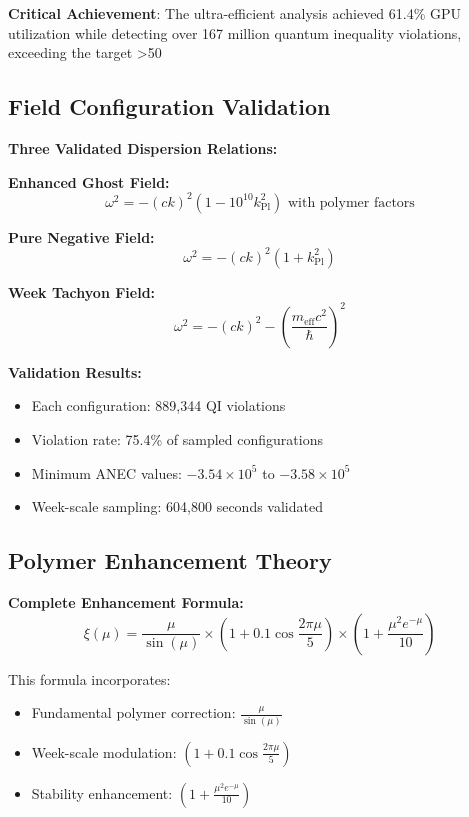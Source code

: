 \documentclass[11pt]{article}
\begin{document}
\textbf{Critical Achievement}: The ultra-efficient analysis achieved 61.4\% GPU utilization while detecting over 167 million quantum inequality violations, exceeding the target >50%

\subsection{Field Configuration Validation}

\textbf{Three Validated Dispersion Relations:}

\textbf{Enhanced Ghost Field:}
\begin{equation}
\omega^2 = -(ck)^2\left(1 - 10^{10} k_{\text{Pl}}^2\right) \text{ with polymer factors}
\end{equation}

\textbf{Pure Negative Field:}
\begin{equation}
\omega^2 = -(ck)^2(1 + k_{\text{Pl}}^2)
\end{equation}

\textbf{Week Tachyon Field:}
\begin{equation}
\omega^2 = -(ck)^2 - \left(\frac{m_{\text{eff}}c^2}{\hbar}\right)^2
\end{equation}

\textbf{Validation Results:}
\begin{itemize}
    \item Each configuration: 889,344 QI violations
    \item Violation rate: 75.4\% of sampled configurations
    \item Minimum ANEC values: $-3.54 \times 10^5$ to $-3.58 \times 10^5$
    \item Week-scale sampling: 604,800 seconds validated
\end{itemize}

\subsection{Polymer Enhancement Theory}

\textbf{Complete Enhancement Formula:}
\begin{equation}
\xi(\mu) = \frac{\mu}{\sin(\mu)} \times \left(1 + 0.1\cos\frac{2\pi\mu}{5}\right) \times \left(1 + \frac{\mu^2 e^{-\mu}}{10}\right)
\end{equation}

This formula incorporates:
\begin{itemize}
    \item Fundamental polymer correction: $\frac{\mu}{\sin(\mu)}$
    \item Week-scale modulation: $\left(1 + 0.1\cos\frac{2\pi\mu}{5}\right)$
    \item Stability enhancement: $\left(1 + \frac{\mu^2 e^{-\mu}}{10}\right)$
\end{itemize}
\end{document}
